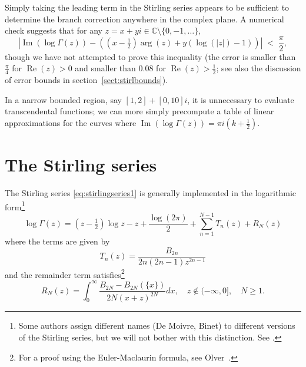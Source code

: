 \documentclass[reqno]{amsart}
\newcommand{\Real}{\operatorname{Re}}
\newcommand{\Imag}{\operatorname{Im}}
\newcommand{\CC}{\mathbb{C}}
\theoremstyle{definition}
\begin{document}
Simply taking the leading term in the Stirling series
appears to be sufficient to determine the branch correction anywhere in the complex plane.
A numerical check suggests that for any $z = x + yi \in \CC \setminus \{0, -1, \ldots \}$,
\begin{equation}
\left|\operatorname{Im}(\log \Gamma(z)) - ((x-\tfrac{1}{2}) \operatorname{arg}(z)+ y(\log(|z|)-1)) \right| \; < \; \frac{\pi}{2},
\end{equation}
though we have not attempted to prove this inequality
(the error is smaller than $\tfrac{\pi}{4}$ for $\Real(z) > 0$ and
smaller than $0.08$ for $\Real(z) > \tfrac{1}{2}$; see also the
discussion of error bounds in section~\ref{sect:stirlbounds}).

In a narrow bounded region, say $[1,2] + [0, 10] i$, it is unnecessary
to evaluate transcendental functions; we can more
simply precompute a table of
linear approximations for the curves where
$\Imag(\log \Gamma(z)) = \pi i (k+\tfrac{1}{2})$.


\section{The Stirling series}

\label{sect:stirlingimpl}

The Stirling series \eqref{eq:stirlingseries1} is generally implemented in the logarithmic form\footnote{Some authors assign different names (De Moivre, Binet) to different versions
of the Stirling series, but we will not bother with this distinction. See \cite{Borwein2018,Corless2019}.}
\begin{equation}
\label{eq:stirlingseries}
    \log \Gamma(z) = \left(z-\tfrac{1}{2}\right)\log z - z +
          \frac{\log(2 \pi)}{2}
            + \sum_{n=1}^{N-1} T_n(z)
          + R_N(z)
\end{equation}
where the terms are given by
\begin{equation}
T_n(z) = \frac{B_{2n}}{2n(2n-1)z^{2n-1}}
\end{equation}
and the remainder term satisfies\footnote{For a proof using the Euler-Maclaurin formula, see Olver~\cite[Chapter 8]{Olver1997}.}
\begin{equation}
\label{eq:stirlingremainder}
    R_N(z) = \int_0^{\infty} \frac{B_{2N} - B_{2N}(\{x\})}{2N(x+z)^{2N}} dx, \quad z \not\in (-\infty, 0], \quad N \ge 1.
\end{equation}
\end{document}
